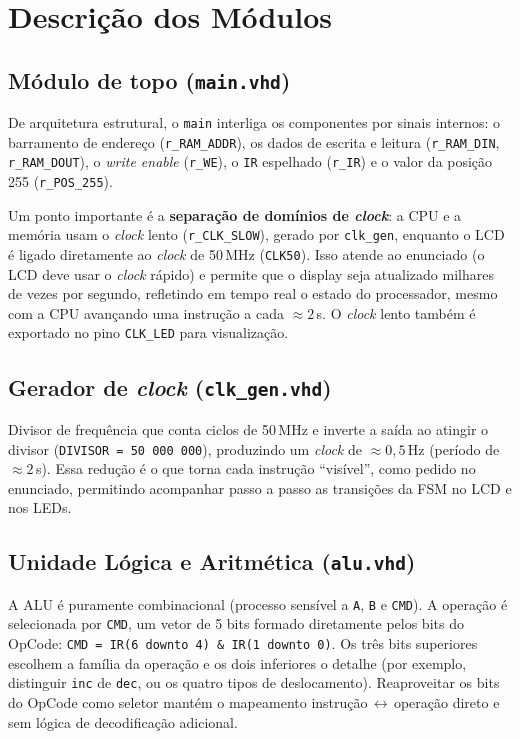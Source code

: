 \documentclass[12pt,a4paper]{article}
\begin{document}
\section{Descrição dos Módulos}

\subsection{Módulo de topo (\texttt{main.vhd})}

De arquitetura estrutural, o \texttt{main} interliga os componentes por sinais internos: o
barramento de endereço (\texttt{r\_RAM\_ADDR}), os dados de escrita e leitura
(\texttt{r\_RAM\_DIN}, \texttt{r\_RAM\_DOUT}), o \textit{write enable} (\texttt{r\_WE}), o
\texttt{IR} espelhado (\texttt{r\_IR}) e o valor da posição 255 (\texttt{r\_POS\_255}).

Um ponto importante é a \textbf{separação de domínios de \textit{clock}}: a CPU e a memória
usam o \textit{clock} lento (\texttt{r\_CLK\_SLOW}), gerado por \texttt{clk\_gen}, enquanto
o LCD é ligado diretamente ao \textit{clock} de 50\,MHz (\texttt{CLK50}). Isso atende ao
enunciado (o LCD deve usar o \textit{clock} rápido) e permite que o display seja atualizado
milhares de vezes por segundo, refletindo em tempo real o estado do processador, mesmo com
a CPU avançando uma instrução a cada $\approx 2$\,s. O \textit{clock} lento também é
exportado no pino \texttt{CLK\_LED} para visualização.

\subsection{Gerador de \textit{clock} (\texttt{clk\_gen.vhd})}

Divisor de frequência que conta ciclos de 50\,MHz e inverte a saída ao atingir o divisor
(\texttt{DIVISOR = 50\,000\,000}), produzindo um \textit{clock} de $\approx 0{,}5$\,Hz
(período de $\approx 2$\,s). Essa redução é o que torna cada instrução ``visível'', como
pedido no enunciado, permitindo acompanhar passo a passo as transições da FSM no LCD e nos
LEDs.

\subsection{Unidade Lógica e Aritmética (\texttt{alu.vhd})}
\label{sec:alu}

A ALU é puramente combinacional (processo sensível a \texttt{A}, \texttt{B} e \texttt{CMD}).
A operação é selecionada por \texttt{CMD}, um vetor de 5 bits formado diretamente pelos bits
do OpCode: \texttt{CMD = IR(6\,downto\,4) \& IR(1\,downto\,0)}. Os três bits superiores
escolhem a família da operação e os dois inferiores o detalhe (por exemplo, distinguir
\texttt{inc} de \texttt{dec}, ou os quatro tipos de deslocamento). Reaproveitar os bits do
OpCode como seletor mantém o mapeamento instrução\,$\leftrightarrow$\,operação direto e
sem lógica de decodificação adicional.
\end{document}
